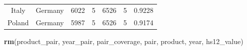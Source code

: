 \documentclass[10pt,]{article}
\newenvironment{Shaded}{\begin{snugshade}}{\end{snugshade}}
\newcommand{\KeywordTok}[1]{\textcolor[rgb]{0.13,0.29,0.53}{\textbf{{#1}}}}
\newcommand{\NormalTok}[1]{{#1}}
\begin{document}
\begin{longtable}[]{@{}ccccccc@{}}
\begin{minipage}[t]{0.13\columnwidth}
Italy\strut
\end{minipage} & \begin{minipage}[t]{0.12\columnwidth}\centering\strut
Germany\strut
\end{minipage} & \begin{minipage}[t]{0.12\columnwidth}\centering\strut
6022\strut
\end{minipage} & \begin{minipage}[t]{0.09\columnwidth}\centering\strut
5\strut
\end{minipage} & \begin{minipage}[t]{0.14\columnwidth}\centering\strut
6526\strut
\end{minipage} & \begin{minipage}[t]{0.11\columnwidth}\centering\strut
5\strut
\end{minipage} & \begin{minipage}[t]{0.11\columnwidth}\centering\strut
0.9228\strut
\end{minipage}\tabularnewline
\begin{minipage}[t]{0.13\columnwidth}\centering\strut
Poland\strut
\end{minipage} & \begin{minipage}[t]{0.12\columnwidth}\centering\strut
Germany\strut
\end{minipage} & \begin{minipage}[t]{0.12\columnwidth}\centering\strut
5987\strut
\end{minipage} & \begin{minipage}[t]{0.09\columnwidth}\centering\strut
5\strut
\end{minipage} & \begin{minipage}[t]{0.14\columnwidth}\centering\strut
6526\strut
\end{minipage} & \begin{minipage}[t]{0.11\columnwidth}\centering\strut
5\strut
\end{minipage} & \begin{minipage}[t]{0.11\columnwidth}\centering\strut
0.9174\strut
\end{minipage}\tabularnewline
\bottomrule
\end{longtable}

\begin{Shaded}
\begin{Highlighting}[]
\KeywordTok{rm}\NormalTok{(product_pair, year_pair, pair_coverage, pair, product, year, hs12_value)}
\end{Highlighting}
\end{Shaded}
\end{document}
